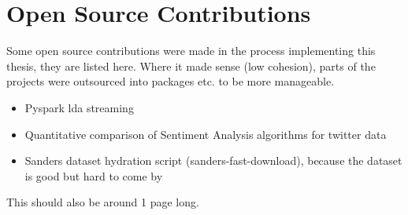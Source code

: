 \chapter{Open Source Contributions}
\label{ch:openSourceContributions}

Some open source contributions were made in the process implementing this thesis, they are listed here.
Where it made sense (low cohesion), parts of the projects were outsourced into packages etc. to be more manageable.

\begin{itemize}
    \item
    Pyspark lda streaming
    \item
    Quantitative comparison of Sentiment Analysis algorithms for twitter data
    \item
    Sanders dataset hydration script (sanders-fast-download), because the dataset is good but hard to come by
\end{itemize}

This should also be around 1 page long.
\pagebreak[1]